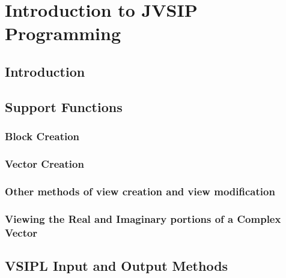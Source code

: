 \chapter{Introduction to JVSIP Programming}
\section*{Introduction}
\section*{Support Functions}
\subsection*{Block Creation}
\subsection*{Vector Creation}
\subsection*{Other methods of view creation and view modification}
\subsection*{Viewing the Real and Imaginary portions of a Complex Vector}
\section*{VSIPL Input and Output Methods}
